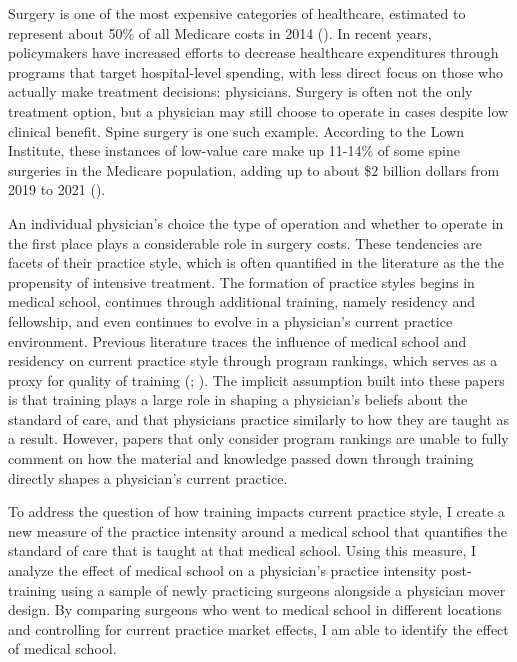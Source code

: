 
Surgery is one of the most expensive categories of healthcare, estimated to represent about 50\% of all Medicare costs in 2014 (\cite{kaye_understanding_2020}). In recent years, policymakers have increased efforts to decrease healthcare expenditures through programs that target hospital-level spending, with less direct focus on those who actually make treatment decisions: physicians. Surgery is often not the only treatment option, but a physician may still choose to operate in cases despite low clinical benefit. Spine surgery is one such example. According to the Lown Institute, these instances of low-value care make up 11-14\% of some spine surgeries in the Medicare population, adding up to about \$2 billion dollars from 2019 to 2021 (\cite{noauthor_unnecessary_nodate}). 

An individual physician's choice the type of operation and whether to operate in the first place plays a considerable role in surgery costs. These tendencies are facets of their practice style, which is often quantified in the literature as the the propensity of intensive treatment. The formation of practice styles begins in medical school, continues through additional training, namely residency and fellowship, and even continues to evolve in a physician's current practice environment. Previous literature traces the influence of medical school and residency on current practice style through program rankings, which serves as a proxy for quality of training (\cite{epstein2009}; \cite{schnell_addressing_2018}). The implicit assumption built into these papers is that training plays a large role in shaping a physician's beliefs about the standard of care, and that physicians practice similarly to how they are taught as a result. However, papers that only consider program rankings are unable to fully comment on how the material and knowledge passed down through training directly shapes a physician's current practice. 

To address the question of how training impacts current practice style, I create a new measure of the practice intensity around a medical school that quantifies the standard of care that is taught at that medical school. Using this measure, I analyze the effect of medical school on a physician's practice intensity post-training using a sample of newly practicing surgeons alongside a physician mover design. By comparing surgeons who went to medical school in different locations and controlling for current practice market effects, I am able to identify the effect of medical school.

